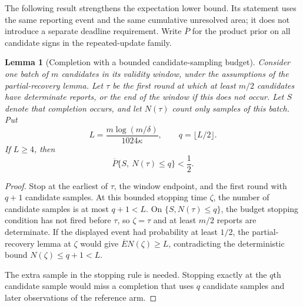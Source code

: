 \documentclass[11pt]{article}
\newtheorem{lemma}[theorem]{Lemma}
\theoremstyle{remark}
\begin{document}
The following result strengthens the expectation lower bound. Its statement
uses the same reporting event and the same cumulative unresolved area; it does
not introduce a separate deadline requirement. Write $\overline P$ for the
product prior on all candidate signs in the repeated-update family.

\begin{lemma}[Completion with a bounded candidate-sampling budget]
\label{lem:budget_completion}
Consider one batch of $m$ candidates in its validity window, under the
assumptions of the partial-recovery lemma. Let $\tau$ be the first round at
which at least $m/2$ candidates have determinate reports, or the end of the
window if this does not occur. Let $S$ denote that completion occurs, and let
$N(\tau)$ count only samples of this batch. Put
\[
 L=\frac{m\log(m/\delta)}{1024\kappa},\qquad
 q=\lfloor L/2\rfloor.
\]
If $L\ge4$, then
\[
 \overline P\{S,\ N(\tau)\le q\}<\frac12.
\]
\end{lemma}
\begin{proof}
Stop at the earliest of $\tau$, the window endpoint, and the first round with
$q+1$ candidate samples. At this bounded stopping time $\zeta$, the number of
candidate samples is at most $q+1<L$. On $\{S,N(\tau)\le q\}$, the budget
stopping condition has not fired before $\tau$, so $\zeta=\tau$ and at least
$m/2$ reports are determinate. If the displayed event had probability at least
$1/2$, the partial-recovery lemma at $\zeta$ would give
$\overline E N(\zeta)\ge L$, contradicting the deterministic bound
$N(\zeta)\le q+1<L$.

The extra sample in the stopping rule is needed. Stopping exactly at the
$q$th candidate sample would miss a completion that uses $q$ candidate
samples and later observations of the reference arm.
\end{proof}
\end{document}
